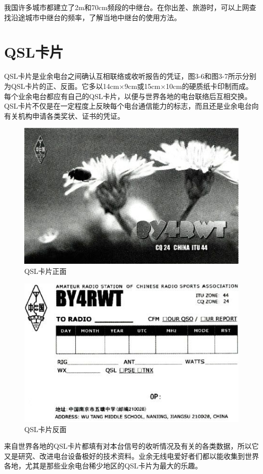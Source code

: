 \documentclass[12pt,UTF8]{ctexbook}
\begin{document}
我国许多城市都建立了2m和70cm频段的中继台。在你出差、旅游时，可以上网查找沿途城市中继台的频率，了解当地中继台的使用方法。

\section{QSL卡片}

QSL卡片是业余电台之间确认互相联络或收听报告的凭证，图3-6和图3-7所示分别为QSL卡片的正、反面。它多以14cm×9cm或15cm×10cm的硬质纸卡印制而成。每个业余电台都应有自己的QSL卡片，以便与世界各地的电台联络后互相交换。QSL卡片不仅是在一定程度上反映每个电台通信能力的标志，而且还是业余电台向有关机构申请各类奖状、证书的凭证。

\begin{figure}[htbp]
	\centering
	\includegraphics[width=0.7\linewidth]{40}
	\caption{QSL卡片正面}
	\label{fig:1}
\end{figure}

\begin{figure}[htbp]
	\centering
	\includegraphics[width=0.7\linewidth]{41}
	\caption{QSL卡片反面}
	\label{fig:1}
\end{figure}

来自世界各地的QSL卡片都填有对本台信号的收听情况及有关的各类数据，所以它又是研究、改进电台设备极好的技术资料。业余无线电爱好者们都以能收集到世界各地，尤其是那些业余电台稀少地区的QSL卡片为最大的乐趣。
\end{document}
